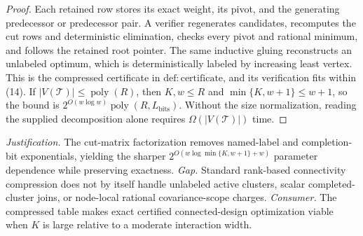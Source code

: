 \documentclass{article}
\begin{document}
\begin{proof}
Each retained row stores its exact weight, its pivot, and the generating predecessor or predecessor pair.  A verifier regenerates candidates, recomputes the cut rows and deterministic elimination, checks every pivot and rational minimum, and follows the retained root pointer.  The same inductive gluing reconstructs an unlabeled optimum, which is deterministically labeled by increasing least vertex.  This is the compressed certificate in \(\mathrm{def:certificate}\), and its verification fits within (14).  If \(|V(\mathcal T)|\le\operatorname{poly}(R)\), then \(K,w\le R\) and \(\min\{K,w+1\}\le w+1\), so the bound is \(2^{O(w\log w)}\operatorname{poly}(R,L_{\mathrm{bits}})\).  Without the size normalization, reading the supplied decomposition alone requires \(\Omega(|V(\mathcal T)|)\) time.
\end{proof}
\par\smallskip\noindent \textit{Justification.} The cut-matrix factorization removes named-label and completion-bit exponentials, yielding the sharper \(2^{O(w\log\min\{K,w+1\}+w)}\) parameter dependence while preserving exactness. \textit{Gap.} Standard rank-based connectivity compression does not by itself handle unlabeled active clusters, scalar completed-cluster joins, or node-local rational covariance-scope charges. \textit{Consumer.} The compressed table makes exact certified connected-design optimization viable when \(K\) is large relative to a moderate interaction width.
\end{document}
